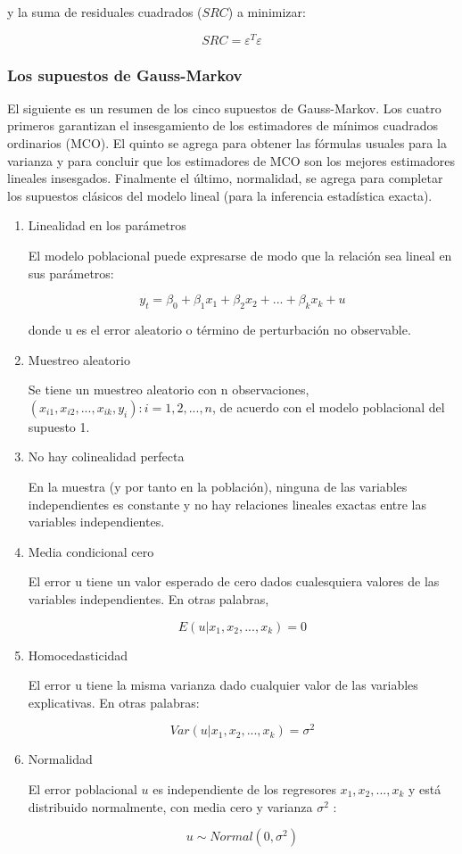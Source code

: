 y la suma de residuales cuadrados ($SRC$) a minimizar:

$$SRC = \varepsilon^{T} \varepsilon $$ 

\subsubsection{Los supuestos de Gauss-Markov} 

El siguiente es un resumen de los cinco supuestos de Gauss-Markov. Los cuatro primeros garantizan el insesgamiento de los estimadores de
mínimos cuadrados ordinarios (MCO). El quinto se agrega para obtener las fórmulas usuales para la varianza y para concluir que los estimadores de MCO son los mejores estimadores lineales insesgados. Finalmente el último, normalidad, se agrega para completar los supuestos clásicos del modelo lineal (para la inferencia estadística exacta).


\begin{enumerate}
	\item Linealidad en los parámetros
	
	El modelo poblacional puede expresarse de modo que la relación sea lineal en sus parámetros: 
	
	$$y_t = \beta_0 + \beta_1 x_1 + \beta_2 x_2 + ... + \beta_k x_k + u$$
	
	donde u es el error aleatorio o término de perturbación no observable.
	
	\item Muestreo aleatorio
	
	Se tiene un muestreo aleatorio con n observaciones, ${(x_{i1} , x_{i2}, ..., x_{ik}, y_i ): i = 1, 2, ..., n} $, de acuerdo con el modelo poblacional del supuesto 1.
	
	
	\item  No hay colinealidad perfecta
	
	En la muestra (y por tanto en la población), ninguna de las variables independientes es constante y no hay relaciones lineales exactas entre las variables independientes. 
	
	\item  Media condicional cero
	
	El error u tiene un valor esperado de cero dados cualesquiera valores de las variables independientes.
	En otras palabras,
	
	$$E(u|x_1,x_2, ..., x_k ) = 0$$
	
	\item Homocedasticidad
	
	El error u tiene la misma varianza dado cualquier valor de las variables explicativas. En otras palabras:
	
	$$ Var(u|x_1,x_2, ..., x_k )= \sigma^2 $$
	
	\item Normalidad 
	
	El error poblacional $u$ es independiente de los regresores $x_1,x_2, ..., x_k$ y está distribuido normalmente, con media cero y varianza $\sigma^2$ : 
	
	$$u \sim Normal(0,\sigma^2 )$$
	
\end{enumerate}

